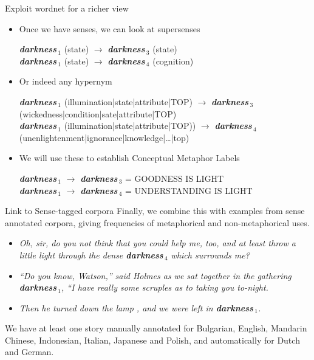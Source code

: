 \documentclass[xetex]{beamer}  %
\newcommand{\wns}[2]{\textit{\textbf{#1}}\,\ensuremath{_#2}}
\begin{document}
\begin{frame}{Exploit wordnet for a richer view}
  \begin{itemize}
  \item Once we have senses, we can look at supersenses
    \begin{tcolorbox}
      \wns{darkness}{1} (state) $\rightarrow$  \wns{darkness}{3} (state)  \\
      \wns{darkness}{1} (state) $\rightarrow$  \wns{darkness}{4} (cognition) 
    \end{tcolorbox}
   \item Or indeed any hypernym
    \begin{tcolorbox}
      \wns{darkness}{1} (illumination|state|attribute|TOP) $\rightarrow$  \wns{darkness}{3} (wickedness|condition|sate|attribute|TOP)  \\
      \wns{darkness}{1} (illumination|state|attribute|TOP)) $\rightarrow$  \wns{darkness}{4} (unenlightenment|ignorance|knowledge|\ldots{}|top) 
    \end{tcolorbox}
  \item We will use these to establish Conceptual Metaphor Labels
    \begin{tcolorbox}
      \wns{darkness}{1} $\rightarrow$  \wns{darkness}{3}  = GOODNESS IS LIGHT  \\
      \wns{darkness}{1} $\rightarrow$  \wns{darkness}{4}  =  UNDERSTANDING IS LIGHT
    \end{tcolorbox}
  \end{itemize}
\end{frame}

\begin{frame}{Link to Sense-tagged corpora}
 Finally, we combine this with examples from sense annotated corpora, giving frequencies of metaphorical and non-metaphorical uses.

 \begin{tcolorbox}[title=Examples from \textit{The Adventure of the Speckled Band} (English)]
   \begin{itemize}
   \item \textit{Oh, sir, do you not think that you could help me, too, and at least throw a little light through the dense  \wns{darkness}{4} which surrounds me?}
   \item \textit{``Do you know, Watson,'' said Holmes as we sat together in the gathering \wns{darkness}{1}, ``I have really some scruples as to taking you to-night.}
   \item \textit{Then he turned down the lamp , and we were left in \wns{darkness}{1}.} 
   \end{itemize}
 \end{tcolorbox}

We have at least one story manually annotated for  Bulgarian, English, Mandarin Chinese, Indonesian, Italian, Japanese and Polish, and automatically for Dutch and German. 
 
\end{frame}
\end{document}

